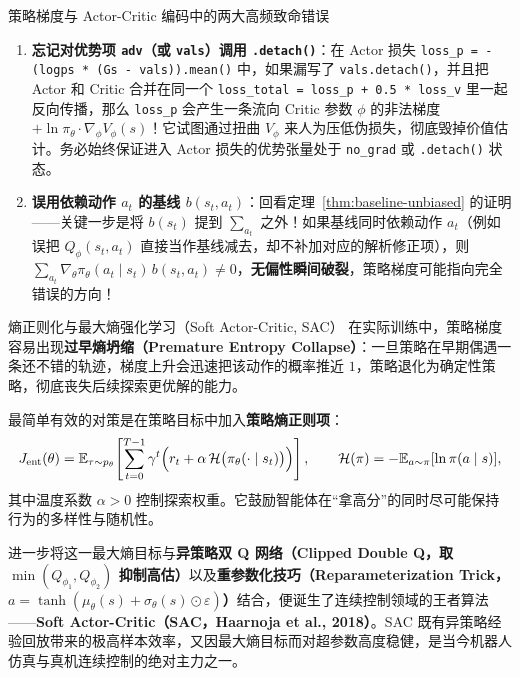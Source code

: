 \begin{failBox}{策略梯度与 Actor-Critic 编码中的两大高频致命错误}
\begin{enumerate}
  \item \textbf{忘记对优势项 \texttt{adv}（或 \texttt{vals}）调用 \texttt{.detach()}}：在 Actor 损失 \texttt{loss\_p = -(logps * (Gs - vals)).mean()} 中，如果漏写了 \texttt{vals.detach()}，并且把 Actor 和 Critic 合并在同一个 \texttt{loss\_total = loss\_p + 0.5 * loss\_v} 里一起反向传播，那么 \texttt{loss\_p} 会产生一条流向 Critic 参数 $\phi$ 的非法梯度 $+\ln\pi_\theta \cdot \nabla_\phi V_\phi(s)$！它试图通过扭曲 $V_\phi$ 来人为压低伪损失，彻底毁掉价值估计。务必始终保证进入 Actor 损失的优势张量处于 \texttt{no\_grad} 或 \texttt{.detach()} 状态。
  \item \textbf{误用依赖动作 $a_t$ 的基线 $b(s_t, a_t)$}：回看定理~\ref{thm:baseline-unbiased} 的证明——关键一步是将 $b(s_t)$ 提到 $\sum_{a_t}$ 之外！如果基线同时依赖动作 $a_t$（例如误把 $Q_\phi(s_t, a_t)$ 直接当作基线减去，却不补加对应的解析修正项），则 $\sum_{a_t} \nabla_\theta \pi_\theta(a_t\mid s_t)\, b(s_t, a_t) \neq 0$，\textbf{无偏性瞬间破裂}，策略梯度可能指向完全错误的方向！
\end{enumerate}
\end{failBox}

\begin{extBox}{熵正则化与最大熵强化学习（Soft Actor-Critic, SAC）}
在实际训练中，策略梯度容易出现\textbf{过早熵坍缩（Premature Entropy Collapse）}：一旦策略在早期偶遇一条还不错的轨迹，梯度上升会迅速把该动作的概率推近 $1$，策略退化为确定性策略，彻底丧失后续探索更优解的能力。

最简单有效的对策是在策略目标中加入\textbf{策略熵正则项}：
\[
  J_{\mathrm{ent}}(\theta) = \mathbb{E}_{\tau \sim p_\theta}\!\left[\sum_{t=0}^{T-1} \gamma^t \Big(r_t + \alpha\, \mathcal{H}\big(\pi_\theta(\cdot \mid s_t)\big)\Big)\right], \qquad
  \mathcal{H}(\pi) = -\mathbb{E}_{a \sim \pi}[\ln \pi(a \mid s)],
\]
其中温度系数 $\alpha > 0$ 控制探索权重。它鼓励智能体在“拿高分”的同时尽可能保持行为的多样性与随机性。

进一步将这一最大熵目标与\textbf{异策略双 Q 网络（Clipped Double Q，取 $\min(Q_{\phi_1}, Q_{\phi_2})$ 抑制高估）}以及\textbf{重参数化技巧（Reparameterization Trick，$a = \tanh(\mu_\theta(s) + \sigma_\theta(s)\odot \varepsilon)$）}结合，便诞生了连续控制领域的王者算法——\textbf{Soft Actor-Critic（SAC，Haarnoja et al., 2018）}。SAC 既有异策略经验回放带来的极高样本效率，又因最大熵目标而对超参数高度稳健，是当今机器人仿真与真机连续控制的绝对主力之一。
\end{extBox}

